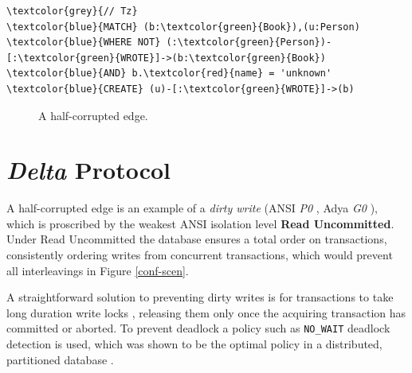 \documentclass[sigplan,10pt]{acmart}
\begin{document}
\begin{Verbatim}[commandchars=\\\{\},fontsize=\small,xleftmargin=.2in]
\textcolor{grey}{// Tz}
\textcolor{blue}{MATCH} (b:\textcolor{green}{Book}),(u:Person)
\textcolor{blue}{WHERE NOT} (:\textcolor{green}{Person})-[:\textcolor{green}{WROTE}]->(b:\textcolor{green}{Book})
\textcolor{blue}{AND} b.\textcolor{red}{name} = 'unknown'
\textcolor{blue}{CREATE} (u)-[:\textcolor{green}{WROTE}]->(b)
\end{Verbatim}

\begin{figure}[ht!]
  \centering
  \caption{A half-corrupted edge.}
  \label{half-corrupted}
\end{figure}

\section{\emph{Delta} Protocol}

A half-corrupted edge is an example of a \emph{dirty write} (ANSI \emph{P0} \cite{Berenson1995}, Adya \emph{G0} \cite{Adya2000}), which is proscribed by the weakest ANSI isolation level \textbf{Read Uncommitted}. Under Read Uncommitted the database ensures a total order on transactions, consistently ordering writes from concurrent transactions, which would prevent all interleavings in Figure \ref{conf-scen}.

A straightforward solution to preventing dirty writes is for transactions to take long duration write locks \cite{Berenson1995}, releasing them only once the acquiring transaction has committed or aborted. To prevent deadlock a policy such as \texttt{NO_WAIT} deadlock detection is used, which was shown to be the optimal policy in a distributed, partitioned database \cite{Harding2017}.
\end{document}
